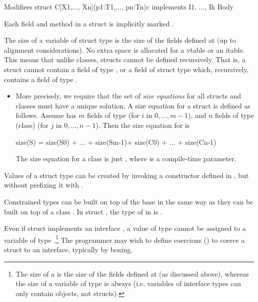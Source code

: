  \begin{x10}
Modifiers struct C[X1,..., Xn](p1:T1,..., pn:Tn){c} 
   implements I1, ..., Ik { 
  Body
}
\end{x10}

Each field and method in a struct is implicitly marked .  

The size of a variable of struct type  is the size of the fields
defined at  (up to alignment considerations). No extra space is
allocated for a vtable or an itable. This means that unlike classes,
structs cannot be defined recursively. That is, a struct  cannot
contain a field of type , or a field of struct type  which,
recursively, contains a field of type .

 \begin{itemize}
\item More precisely, we require that the set of \emph{size equations}
  for all structs and classes must have a unique solution. A size
  equation for a struct  is defined as follows. Assume  has $m$ fields
  of type  (for $i$ in $0,\ldots, m-1$), and $n$ fields of type (class) 
  (for $j$ in $0,..., n-1$). Then the size equation for  is 
\begin{x10}
size(S) =  size(S0) + ... + size(Sm-1)+ size(C0) + ... + size(Cn-1) 
\end{x10}
The size
  equation for a class  is just , where
   is a compile-time parameter.
\end{itemize}

Values of a struct  type can be created by invoking a constructor
defined in , but without prefixing it with .

Constrained types can be built on top of the base  in the same way as
they can be built on top of a class . In struct ,
the type of  in  is .


Even if struct  implements an interface , a value of
type  cannot be assigned to a variable of type
.\footnote{ The size of a  is the size of the fields
  defined at  (as discussed above), whereas the size of a
  variable of type  is always  (i.e.{}
  variables of interface types can only contain objects, not structs).
} The programmer may wish to define coercions
() to coerce a struct to an interface,
typically by boxing.

